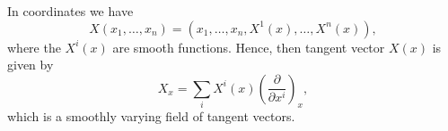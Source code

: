 
\clearpage

\noindent In coordinates we have
\[
X(x_1,\ldots,x_n)=\left(x_1,\ldots,x_n,X^1(x),\ldots,X^n(x)\right),
\]
where the $X^i(x)$ are smooth functions. Hence, then tangent vector $X(x)$ is given by
\[
X_x=\sum_iX^i(x)\left(\frac{\partial}{\partial x^i}\right)_x,
\]
which is a smoothly varying field of tangent vectors.

\noindent{}

